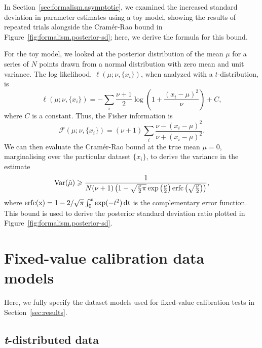 \documentclass[fleqn,usenatbib]{rasti}
\begin{document}
In Section~\ref{sec:formalism.asymptotic}, we examined the increased standard
deviation in parameter estimates using a toy model, showing the results of
repeated trials alongside the Cram\'er-Rao bound \citep{Rao:1945, Cramer:1946}
in Figure~\ref{fig:formalism.posterior-sd}; here, we derive the formula for this
bound.

For the toy model, we looked at the posterior distribution of the mean $\mu$ for
a series of $N$ points drawn from a normal distribution with zero mean and unit
variance. The log likelihood, $\ell (\mu; \nu, \{x_i\})$, when analyzed with a
$t$-distribution, is
\begin{equation}
    \ell (\mu; \nu, \{x_i\}) =
        - \sum_i \frac{\nu + 1}{2} \log \left(
            1 + \frac{(x_i - \mu)^2}{\nu}
        \right) + C,
\end{equation}
where $C$ is a constant. Thus, the Fisher information is
\begin{equation}
    \mathcal F(\mu; \nu, \{x_i\}) =
        (\nu + 1) \sum_i \frac{\nu - (x_i - \mu)^2}{\nu + (x_i - \mu)^2}.
\end{equation}
We can then evaluate the Cram\'er-Rao bound at the true mean $\mu = 0$,
marginalising over the particular dataset $\{x_i\}$, to derive the variance in
the estimate
\begin{equation}
    {\rm Var}(\hat{\mu}) \geq
        \frac{1}{N(\nu + 1) \left(
            1 - \sqrt{\frac\nu2 \pi} \exp\left(\frac\nu2\right)
            {\rm erfc}\left(\sqrt{\frac\nu2}\right)
        \right)},
\end{equation}
where ${\rm erfc (x)} = 1 - 2/\sqrt{\pi} \int_0^x \exp(-t^2) \,{\rm d}t$ is the
complementary error function.  This bound is used to derive the posterior
standard deviation ratio plotted in Figure~\ref{fig:formalism.posterior-sd}.


\section{Fixed-value calibration data models}
\label{sec:data-models}

Here, we fully specify the dataset models used for fixed-value calibration tests
in Section~\ref{sec:results}.

\subsection{\textit{t}-distributed data}
\label{sec:data-models.t}
\end{document}
